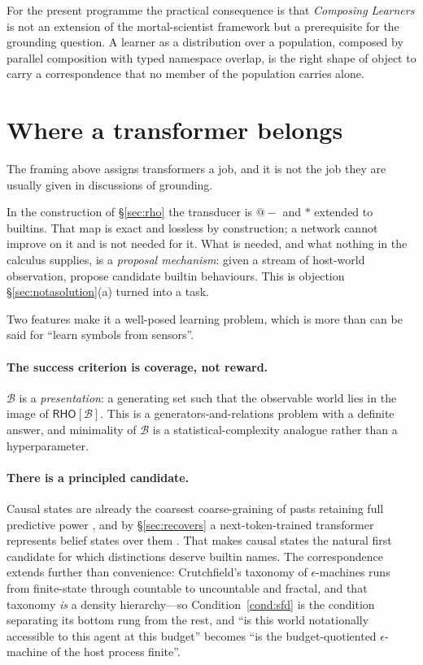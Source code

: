 \documentclass[11pt,a4paper]{article}
\makeatletter
\theoremstyle{definition}
\theoremstyle{plain}
\theoremstyle{remark}
\newcommand{\RHO}{\mathsf{RHO}}
\newcommand{\Bee}{\mathcal{B}}
\newcommand{\quo}[1]{@#1}
\makeatother
\begin{document}
For the present programme the practical consequence is that \emph{Composing Learners} is
not an extension of the mortal-scientist framework but a prerequisite for the grounding
question. A learner as a distribution over a population, composed by parallel composition
with typed namespace overlap, is the right shape of object to carry a correspondence that
no member of the population carries alone.

\section{Where a transformer belongs}
\label{sec:transformer}

The framing above assigns transformers a job, and it is not the job they are usually given
in discussions of grounding.

In the construction of \S\ref{sec:rho} the transducer is $\quo{-}$ and $*$ extended to
builtins. That map is exact and lossless by construction; a network cannot improve on it
and is not needed for it. What is needed, and what nothing in the calculus supplies, is a
\emph{proposal mechanism}: given a stream of host-world observation, propose candidate
builtin behaviours. This is objection \S\ref{sec:notasolution}(a) turned into a task.

Two features make it a well-posed learning problem, which is more than can be said for
``learn symbols from sensors''.

\paragraph{The success criterion is coverage, not reward.} $\Bee$ is a \emph{presentation}:
a generating set such that the observable world lies in the image of $\RHO[\Bee]$. This is
a generators-and-relations problem with a definite answer, and minimality of $\Bee$ is a
statistical-complexity analogue rather than a hyperparameter.

\paragraph{There is a principled candidate.} Causal states are already the coarsest
coarse-graining of pasts retaining full predictive power \cite{shalizi2001}, and by
\S\ref{sec:recovers} a next-token-trained transformer represents belief states over them
\cite{shai2024}. That makes causal states the natural first candidate for which
distinctions deserve builtin names. The correspondence extends further than convenience:
Crutchfield's taxonomy of $\epsilon$-machines runs from finite-state through countable to
uncountable and fractal, and that taxonomy \emph{is} a density hierarchy---so
Condition~\ref{cond:sfd} is the condition separating its bottom rung from the rest, and
``is this world notationally accessible to this agent at this budget'' becomes ``is the
budget-quotiented $\epsilon$-machine of the host process finite''.
\end{document}
